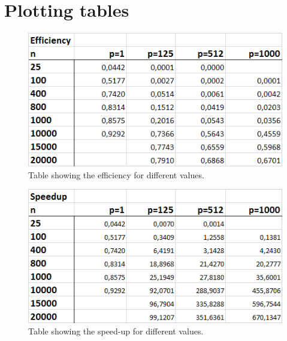 \documentclass[a4paper,11pt,oneside]{book}
\begin{document}
\section{Plotting tables}
\begin{figure}[H]
  \centering
  \includegraphics[width=0.9\linewidth]{table-eff.png}
  \caption{Table showing the efficiency for different values.}
  \centering
  \label{fig:sub1}
\end{figure}
\begin{figure}[H]
  \centering
  \includegraphics[width=0.9\linewidth]{table-speedup.png}
  \caption{Table showing the speed-up for different values.}
  \centering
  \label{fig:sub1}
\end{figure}
\end{document}
